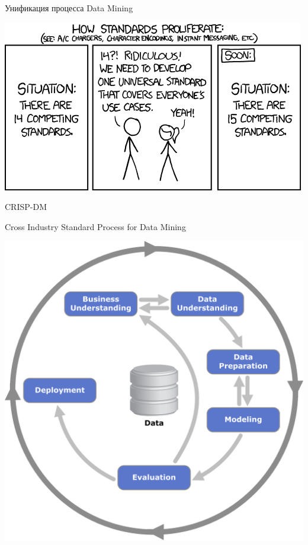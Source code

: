 \documentclass[aspectratio=169]{beamer}
\begin{document}
\begin{frame}{}

\begin{center}
{\LARGE Унификация процесса Data Mining}

\vspace{2em}
\includegraphics[scale=0.6]{images/standards.png}
\end{center}

\end{frame}

\begin{frame}{CRISP-DM}

Cross Industry Standard Process for Data Mining

\begin{center}
\includegraphics[height=0.7\textheight]{images/crisp.png}
\end{center}

\end{frame}
\end{document}
